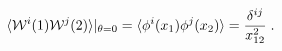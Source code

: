 \begin{equation}\label{frpr} 
\langle {\cal W}^i(1){\cal W}^j(2) \rangle|_{\theta=0}  = \langle \phi^i(x_1)\phi^j(x_2) \rangle = \frac{\delta^{ij}}{x^2_{12}} \;. 
\end{equation} 

